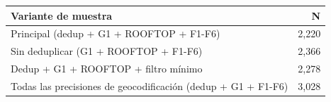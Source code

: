 \begin{tabular}{lr}
\toprule
Variante de muestra & N \\
\midrule
Principal (dedup + G1 + ROOFTOP + F1-F6) & 2,220 \\
Sin deduplicar (G1 + ROOFTOP + F1-F6) & 2,366 \\
Dedup + G1 + ROOFTOP + filtro mínimo & 2,278 \\
Todas las precisiones de geocodificación (dedup + G1 + F1-F6) & 3,028 \\
\bottomrule
\end{tabular}